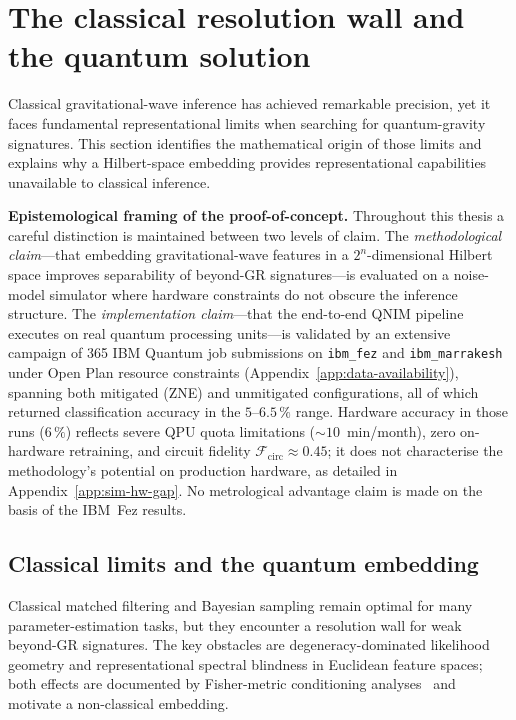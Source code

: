 \documentclass[11pt,a4paper, english]{book}
\theoremstyle{plain}
\theoremstyle{definition}
\numberwithin{equation}{chapter}
\numberwithin{figure}{chapter}
\numberwithin{table}{chapter}
\begin{document}
\section{The classical resolution wall and the quantum solution}
\label{sec:resolution-wall-quantum}

Classical gravitational-wave inference has achieved remarkable precision, yet
it faces fundamental representational limits when searching for quantum-gravity
signatures.
This section identifies the mathematical origin of those limits and explains
why a Hilbert-space embedding provides representational capabilities
unavailable to classical inference.

\medskip
\noindent\textbf{Epistemological framing of the proof-of-concept.}
Throughout this thesis a careful distinction is maintained between two levels
of claim.
The \emph{methodological claim}—that embedding gravitational-wave features in a
$2^n$-dimensional Hilbert space improves separability of beyond-GR
signatures—is evaluated on a noise-model simulator where hardware constraints
do not obscure the inference structure.
The \emph{implementation claim}—that the end-to-end QNIM pipeline executes on
real quantum processing units—is validated by an extensive campaign of 365
IBM Quantum job submissions on \texttt{ibm\_fez} and \texttt{ibm\_marrakesh}
under Open Plan resource constraints (Appendix~\ref{app:data-availability}),
spanning both mitigated (ZNE) and unmitigated configurations, all of which
returned classification accuracy in the $5$--$6.5\,\%$ range.
Hardware accuracy in those runs ($6\,\%$) reflects severe QPU quota limitations
(${\sim}10$~min/month), zero on-hardware retraining, and circuit fidelity
$\mathcal{F}_{\mathrm{circ}}\approx 0.45$; it does not characterise the
methodology's potential on production hardware, as detailed in
Appendix~\ref{app:sim-hw-gap}.
No metrological advantage claim is made on the basis of the IBM~Fez results.

\subsection{Classical limits and the quantum embedding}
\label{sec:classical-limits}

Classical matched filtering and Bayesian sampling remain optimal for many
parameter-estimation tasks, but they encounter a resolution wall for weak
beyond-GR signatures.
The key obstacles are degeneracy-dominated likelihood geometry and
representational spectral blindness in Euclidean feature spaces; both effects
are documented by Fisher-metric conditioning analyses~\cite{Vallisneri_2008}
and motivate a non-classical embedding.
\end{document}
